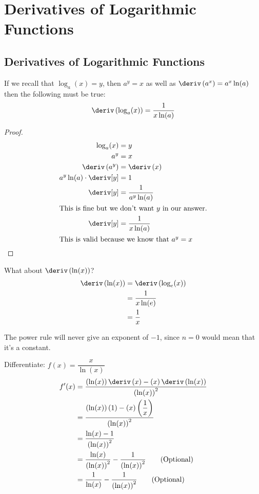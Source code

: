 
\section{Derivatives of Logarithmic Functions}
\subsection{Derivatives of Logarithmic Functions}
\begin{theorem}
    If we recall that $\log_a(x) = y$, then $a^y = x$ as well as $\deriv\left(a^x\right) = a^x \ln(a)$ then the following must be true:
    \begin{equation}
        \deriv \left(\log_a(x)\right) = \dfrac{1}{x\ln(a)}
    \end{equation}
\end{theorem}
\begin{proof}
    \begin{align*}
        \log_a(x) &= y \\
        a^y &= x \\
        \deriv \left(a^y\right)    &= \deriv \left(x\right)\\
        a^y \ln(a) \cdot \deriv[y] &= 1 \\
        \deriv[y]                  &= \dfrac{1}{a^y \ln(a)} \\
        \intertext{This is fine but we don't want $y$ in our answer.}
        \deriv[y]                  &= \dfrac{1}{x \ln(a)} \\
        \intertext{This is valid because we know that $a^y = x$}
    \end{align*}
\end{proof}
What about $\deriv\left(\ln(x)\right)$?
\begin{align*}
    \deriv\left(\ln(x)\right) &= \deriv \left(\log_e(x)\right) \\
                              &= \dfrac{1}{x\ln(e)} \\
                              &= \dfrac{1}{x}
\end{align*}
\begin{note}
    The power rule will never give an exponent of $-1$, since $n = 0$ would mean that it's a constant.
\end{note}
\begin{example}
    Differentiate: $f(x) = \dfrac{x}{\ln(x)}$
    \begin{align*}
        f'(x) &= \dfrac{\left(\ln(x)\right)\deriv\left(x\right) - \left(x\right)\deriv\left(\ln(x)\right)}{\left(\ln(x)\right)^2} \\
              &= \dfrac{\left(\ln(x)\right)\left(1\right) - \left(x\right)\left(\dfrac{1}{x}\right)}{\left(\ln(x)\right)^2} \\
              &= \dfrac{\ln(x) - 1}{\left(\ln(x)\right)^2} \\
              &= \dfrac{\ln(x)}{\left(\ln(x)\right)^2} - \dfrac{1}{\left(\ln(x)\right)^2} \tag{Optional} \\
              &= \dfrac{1}{\ln(x)} - \dfrac{1}{\left(\ln(x)\right)^2} \tag{Optional}
    \end{align*}
\end{example}

